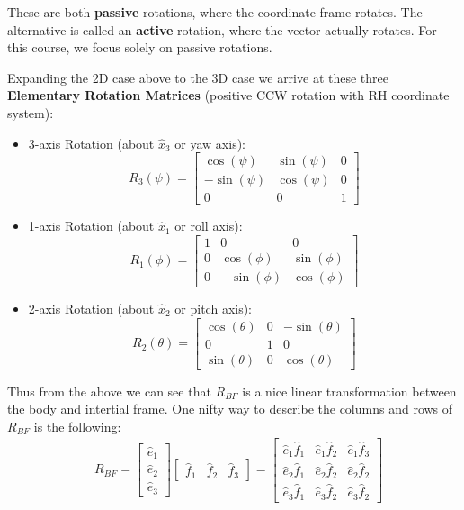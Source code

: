 \documentclass{article}
\begin{document}
These are both \textbf{passive} rotations, where the coordinate frame rotates. The alternative is called an \textbf{active} rotation, where the vector actually rotates. For this course, we focus solely on passive rotations.


Expanding the 2D case above to the 3D case we arrive at these three \textbf{Elementary Rotation Matrices} (positive CCW rotation with RH coordinate system):
\begin{itemize}
    \item 3-axis Rotation (about $\hat{x}_3$ or yaw axis): \begin{equation}
        R_3(\psi) = \begin{bmatrix}\cos(\psi) & \sin(\psi) & 0 \\ -\sin(\psi) & \cos(\psi) & 0 \\ 0 & 0 & 1\end{bmatrix}
    \end{equation}
    \item 1-axis Rotation (about $\hat{x}_1$ or roll axis): \begin{equation}
        R_1(\phi) = \begin{bmatrix}1 & 0 & 0 \\ 0 & \cos(\phi) & \sin(\phi) \\ 0 & -\sin(\phi) & \cos(\phi)\end{bmatrix}
    \end{equation}
    \item 2-axis Rotation (about $\hat{x}_2$ or pitch axis): \begin{equation}
        R_2(\theta) = \begin{bmatrix}\cos(\theta) & 0 & -\sin(\theta) \\ 0 & 1 & 0 \\ \sin(\theta) & 0 & \cos(\theta)\end{bmatrix}
    \end{equation}
\end{itemize}
Thus from the above we can see that $R_{BF}$ is a nice linear transformation between the body and intertial frame. One nifty way to describe the columns and rows of $R_{BF}$ is the following:
\begin{align*}
    & R_{BF} = \begin{bmatrix} \hat{e}_1 \\ \hat{e}_2 \\ \hat{e}_3 \end{bmatrix} \begin{bmatrix} \hat{f}_1 & \hat{f}_2 & \hat{f}_3 \end{bmatrix} = \begin{bmatrix} \hat{e}_1 \hat{f}_1 & \hat{e}_1 \hat{f}_2 & \hat{e}_1 \hat{f}_3 \\ \hat{e}_2 \hat{f}_1 & \hat{e}_2 \hat{f}_2 & \hat{e}_2 \hat{f}_2 \\ \hat{e}_3 \hat{f}_1 & \hat{e}_3 \hat{f}_2 & \hat{e}_3 \hat{f}_2 \end{bmatrix}
\end{align*}
\end{document}
